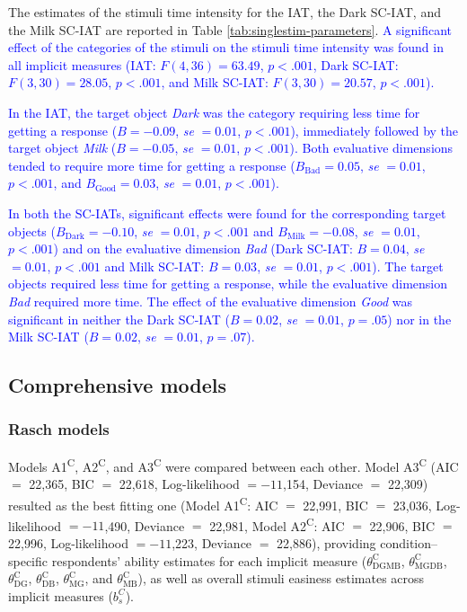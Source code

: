 \documentclass[12pt]{book}
\begin{document}
The estimates of the stimuli time intensity for the IAT, the Dark SC-IAT, and the Milk SC-IAT are reported in Table \ref{tab:singlestim-parameters}.
\textcolor{blue}{A significant effect of the categories of the stimuli on the stimuli time intensity was found in all implicit measures (IAT: $F(4,36) = 63.49$, $p<.001$, Dark SC-IAT: $F(3,30) =28.05$, $p<.001$, and Milk SC-IAT: $F(3,30) =20.57$, $p<.001$). }

\textcolor{blue}{In the IAT, the target object \emph{Dark} was the category requiring less time for getting a response ($B = -0.09$, \emph{se}  $= 0.01$, $p <. 001$), immediately followed by the target object \emph{Milk} ($B = -0.05$, \emph{se}  $= 0.01$, $p <. 001$). 
	Both evaluative dimensions tended to require more time for getting a response ($B_{\text{Bad}} = 0.05$, \emph{se}  $= 0.01$, $p <. 001$, and $B_{\text{Good}} = 0.03$, \emph{se}  $= 0.01$, $p <. 001$).
}

\textcolor{blue}{In both the SC-IATs, significant effects were found for the corresponding target objects ($B_{\text{Dark}} = -0.10$, \emph{se}  $= 0.01$, $p <.001$ and $B_{\text{Milk}} = -0.08$, \emph{se}  $= 0.01$, $p <.001$) and on the evaluative dimension \emph{Bad} (Dark SC-IAT: $B = 0.04$, \emph{se}  $= 0.01$, $p <.001$ and Milk SC-IAT: $B = 0.03$, \emph{se}  $= 0.01$, $p <.001$). The target objects required less time for getting a response, while the evaluative dimension \emph{Bad} required more time.
	The effect of the evaluative dimension \emph{Good} was significant in neither the Dark SC-IAT  ($B = 0.02$, \emph{se}  $= 0.01$, $p = .05$) nor in the Milk SC-IAT ($B =0.02$, \emph{se}  $= 0.01$, $p=.07$).}

\subsection{Comprehensive models} 

\subsubsection{Rasch models}

Models A1\textsuperscript{C}, A2\textsuperscript{C}, and A3\textsuperscript{C} were compared between each other. Model A3\textsuperscript{C} (AIC $=$ 22,365, BIC $=$ 22,618, Log-likelihood $= -11$,154, Deviance $=$ 22,309) resulted as the best fitting one (Model A1\textsuperscript{C}: AIC $=$ 22,991, BIC $=$ 23,036, Log-likelihood $= -11$,490, Deviance $=$ 22,981, Model A2\textsuperscript{C}: AIC $=$ 22,906, BIC $=$ 22,996, Log-likelihood $= -11$,223, Deviance $=$ 22,886), providing condition--specific respondents' ability estimates for each implicit measure ($\theta_{\text{DGMB}}^\text{C}$, $\theta_{\text{MGDB}}^\text{C}$, $\theta_{\text{DG}}^\text{C}$, $\theta_{\text{DB}}^\text{C}$, $\theta_{\text{MG}}^\text{C}$, and $\theta_{\text{MB}}^\text{C}$), as well as overall stimuli easiness estimates across implicit measures ($b_s^C$).
\end{document}
